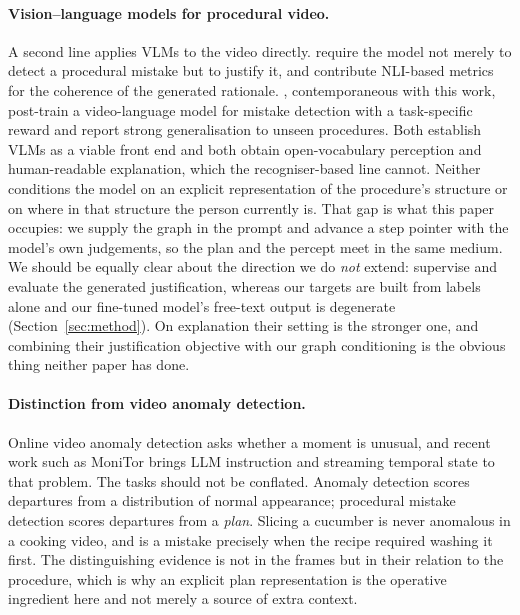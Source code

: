\documentclass[10pt,twocolumn]{article}
\begin{document}
\paragraph{Vision--language models for procedural video.}
A second line applies VLMs to the video directly.
\citet{storks2025transparent} require the model not merely to detect a
procedural mistake but to justify it, and contribute NLI-based metrics for the
coherence of the generated rationale. \citet{spurio2026posttraining},
contemporaneous with this work, post-train a video-language model for mistake
detection with a task-specific reward and report strong generalisation to unseen
procedures. Both establish VLMs as a viable front end and both obtain
open-vocabulary perception and human-readable explanation, which the
recogniser-based line cannot. Neither conditions the model on an explicit
representation of the procedure's structure or on where in that structure the
person currently is. That gap is what this paper occupies: we supply the graph
in the prompt and advance a step pointer with the model's own judgements, so the
plan and the percept meet in the same medium. We should be equally clear about
the direction we do \emph{not} extend: \citet{storks2025transparent} supervise
and evaluate the generated justification, whereas our targets are built from
labels alone and our fine-tuned model's free-text output is degenerate
(Section~\ref{sec:method}). On explanation their setting is the stronger one,
and combining their justification objective with our graph conditioning is the
obvious thing neither paper has done.

\paragraph{Distinction from video anomaly detection.}
Online video anomaly detection asks whether a moment is unusual, and recent work
such as MoniTor \citep{monitor2025} brings LLM instruction and streaming
temporal state to that problem. The tasks should not be conflated. Anomaly
detection scores departures from a distribution of normal appearance; procedural
mistake detection scores departures from a \emph{plan}. Slicing a cucumber is
never anomalous in a cooking video, and is a mistake precisely when the recipe
required washing it first. The distinguishing evidence is not in the frames but
in their relation to the procedure, which is why an explicit plan representation
is the operative ingredient here and not merely a source of extra context.
\end{document}
